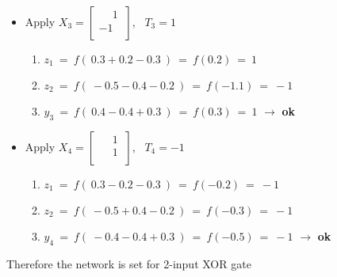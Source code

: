 \documentclass[12pt]{article}
\begin{document}
\begin{itemize}
{	}

	\item Apply $X_3 = \begin{bmatrix}
		\phantom{-}1\ \\ 	
		-1\ \\ 	
	\end{bmatrix}$, \  $T_3 = 1$
	
	{	
		\begin{enumerate}
			\item $z_1 \ = \ f(\ 0.3  +  0.2 - 0.3\ ) \ = \ f(0.2) \ = \ 1$
			\item $z_2 \ = \ f(\ -0.5 - 0.4 - 0.2 \ ) \ = \ f(-1.1) \ = \ -1$
			\item $y_3 \ = \ f (\ 0.4 - 0.4 + 0.3 \ )\ = \ f(0.3)  \ = \ 1$ $\rightarrow$ \textbf{ok}

		\end{enumerate}
		
	}

	\item Apply $X_4 = \begin{bmatrix}
		\phantom{-}1\ \\ 	
		\phantom{-}1\ \\ 	
	\end{bmatrix}$, \  $T_4 = -1$
	
	{	
		\begin{enumerate}
			\item $z_1 \ = \ f(\ 0.3 -  0.2 - 0.3 \ ) \ = \ f(-0.2) \ = \ -1$
			\item $z_2 \ = \ f(\ -0.5 + 0.4 - 0.2 \ ) \ = \ f(-0.3) \ = \ -1$
			\item $y_4 \ = \ f (\ -0.4 - 0.4 + 0.3 \ )\ = \ f(-0.5)  \ = \ -1$ $\rightarrow$ \textbf{ok}
			
		\end{enumerate}
		
	}

	
	
\end{itemize}
Therefore the network is set for 2-input XOR gate
\end{document}
